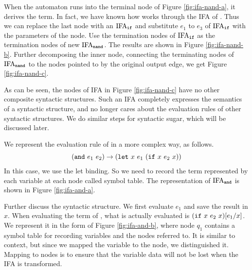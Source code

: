 \begin{example}
When the automaton runs into the terminal node of Figure \ref{fig:ifa-nand-a}, it derives the  term. In fact, we have known how  works through the IFA of . Thus we can replace the last node with an $\text{IFA}_{\mbox{\tt \scriptsize if}}$ and substitute $e_1$ to $e_3$ of $\text{IFA}_{\mbox{\tt \scriptsize if}}$ with the parameters of the node. Use the termination nodes of $\text{IFA}_{\mbox{\tt \scriptsize if}}$ as the termination nodes of new $\text{IFA}_{\mbox{\tt \scriptsize \scriptsize nand}}$. The results are shown in Figure \ref{fig:ifa-nand-b}. Further decomposing the inner  node, connecting the terminating nodes of $\text{IFA}_{\mbox{\tt \scriptsize nand}}$ to the nodes pointed to by the original output edge, we get Figure \ref{fig:ifa-nand-c}.

As can be seen, the nodes of IFA in Figure \ref{fig:ifa-nand-c} have no other composite syntactic structures. Such an IFA completely expresses the semantics of a syntactic structure, and no longer cares about the evaluation rules of other syntactic structures. We do similar steps for syntactic sugar, which will be discussed later.
\myend
\end{example}

\begin{example}

We represent the evaluation rule of  in a more complex way, as follows.
\[
(\mbox{\tt and}~e_1~e_2) \to (\mbox{\tt let}~x~e_1~(\mbox{\tt if}~x~e_2~x))
\]
In this case, we use the let binding. So we need to record the term represented by each variable at each node called symbol table. The representation of $\text{IFA}_{\mbox{\tt \scriptsize and}}$ is shown in Figure \ref{fig:ifa-and-a}.

Further discuss the syntactic structure. We first evaluate $e_1$ and save the result in $x$. When evaluating the term of , what is actually evaluated is $(\mbox{\tt if}~x~e_2~x)[e_1/x]$. We represent it in the form of Figure \ref{fig:ifa-and-b}, where node $q_1$ contains a symbol table for recording variables and the nodes referred to. It is similar to context, but since we mapped the variable to the node, we distinguished it. Mapping to nodes is to ensure that the variable data will not be lost when the IFA is transformed.
\myend
\end{example}


